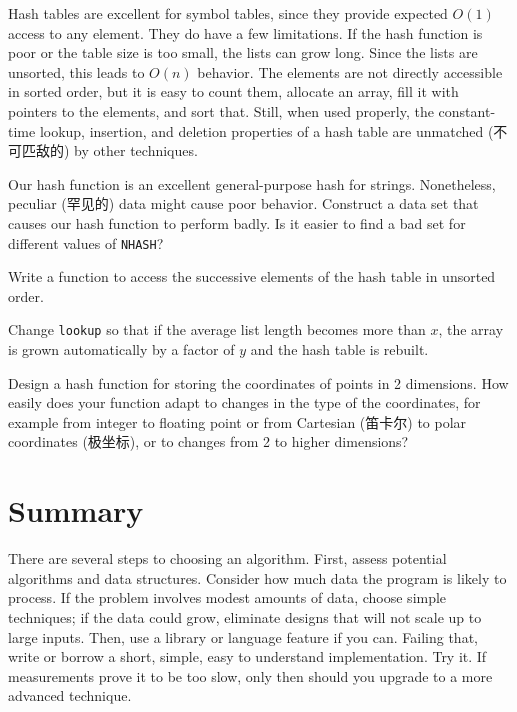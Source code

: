 Hash tables are excellent for symbol tables, since they provide expected
$O(1)$ access to any element. They do have a few limitations. If the hash
function is poor or the table size is too small, the lists can grow long.
Since the lists are unsorted, this leads to $O(n)$ behavior. The elements
are not directly accessible in sorted order, but it is easy to count them,
allocate an array, fill it with pointers to the elements, and sort that.
Still, when used properly, the constant-time lookup, insertion, and
deletion properties of a hash table are unmatched (不可匹敌的) by other
techniques. 

\begin{exercise}
Our hash function is an excellent general-purpose hash for strings.
Nonetheless, peculiar (罕见的) data might cause poor behavior. Construct a
data set that causes our hash function to perform badly. Is it easier to
find a bad set for different values of \verb'NHASH'?
\end{exercise}

\begin{exercise}
Write a function to access the successive elements of the hash table in
unsorted order.
\end{exercise}

\begin{exercise}
Change \verb'lookup' so that if the average list length becomes more than
$x$, the array is grown automatically by a factor of $y$ and the hash table
is rebuilt.
\end{exercise}

\begin{exercise}
Design a hash function for storing the coordinates of points in 2
dimensions. How easily does your function adapt to changes in the type of
the coordinates, for example from integer to floating point or from
Cartesian (笛卡尔) to polar coordinates (极坐标), or to changes from 2 to
higher dimensions?
\end{exercise}

\section{Summary}

There are several steps to choosing an algorithm. First, assess potential
algorithms and data structures. Consider how much data the program is
likely to process. If the problem involves modest amounts of data, choose
simple techniques; if the data could grow, eliminate designs that will not
scale up to large inputs. Then, use a library or language feature if you
can. Failing that, write or borrow a short, simple, easy to understand
implementation. Try it. If measurements prove it to be too slow, only then
should you upgrade to a more advanced technique.

